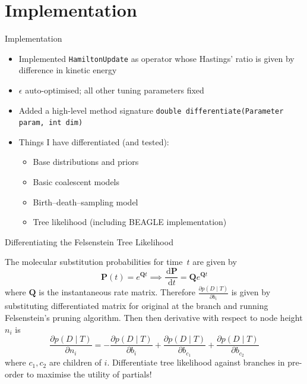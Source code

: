 \documentclass{beamer}
\newcommand{\dd}{\, \text{d}}
\newcommand{\mat}[1]{\ensuremath{\mathbf{#1}}}
\begin{document}
    \section{Implementation}

    \begin{frame}{Implementation}

        \begin{itemize}
            
            \item Implemented \texttt{HamiltonUpdate} as operator whose Hastings' ratio is given by difference in kinetic energy
            
            \item $\epsilon$ auto-optimised; all other tuning parameters fixed
            
            \item Added a high-level method signature \texttt{double~differentiate(Parameter param, int dim)}
            
            \item Things I have differentiated (and tested):
                \begin{itemize}
                    \item Base distributions and priors
                    \item Basic coalescent models
                    \item Birth--death--sampling model
                    \item Tree likelihood (including BEAGLE implementation)
                \end{itemize}
            
        \end{itemize}

    \end{frame}

    \begin{frame}{Differentiating the Felsenstein Tree Likelihood}

        The molecular substitution probabilities for time~$t$ are given by
        \begin{equation*}
            \mat{P}\left(t\right) = e^{\mat{Q}t} \implies \frac{\dd \mat{P}}{\dd t} = \mat{Q}e^{\mat{Q}t}
        \end{equation*}
        where $\mat{Q}$ is the instantaneous rate matrix.
        Therefore $\frac{\partial p\left(D\mid T\right)}{\partial b_i}$ is given by substituting differentiated matrix for original at the branch and running Felsenstein's pruning algorithm.
        Then then derivative with respect to node height $n_i$ is
        \begin{equation*}
            \frac{\partial p\left(D\mid T\right)}{\partial n_i} = - \frac{\partial p\left(D\mid T\right)}{\partial b_i} + \frac{\partial p\left(D\mid T\right)}{\partial b_{c_1}} + \frac{\partial p\left(D\mid T\right)}{\partial b_{c_2}}
        \end{equation*}
        where $c_1,c_2$ are children of $i$.
        Differentiate tree likelihood against branches in pre-order to maximise the utility of partials!

    \end{frame}
\end{document}
